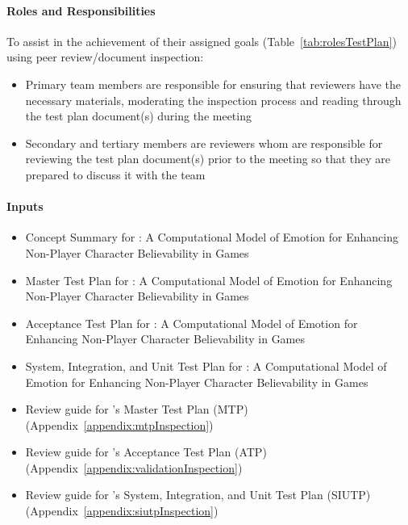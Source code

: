 \paragraph{Roles and Responsibilities} To assist in the achievement of their
assigned goals (Table~\ref{tab:rolesTestPlan}) using peer review/document
inspection:
\begin{itemize}

    \item Primary team members are responsible for ensuring that reviewers have
    the necessary materials, moderating the inspection process and reading
    through the test plan document(s) during the meeting

    \item Secondary and tertiary members are reviewers whom are responsible for
    reviewing the test plan document(s) prior to the meeting so that they are
    prepared to discuss it with the team

\end{itemize}

\paragraph{Inputs}
\begin{itemize}

    \item Concept Summary for \progname{}: A Computational Model of Emotion for
    Enhancing Non-Player Character Believability in Games

    \item Master Test Plan for \progname{}: A Computational Model of Emotion
    for Enhancing Non-Player Character Believability in Games

    \item Acceptance Test Plan for \progname{}: A Computational Model of
    Emotion for Enhancing Non-Player Character Believability in Games

    \item System, Integration, and Unit Test Plan for \progname{}: A
    Computational Model of Emotion for Enhancing Non-Player Character
    Believability in Games

    \item Review guide for \progname{}'s Master Test Plan (MTP)
    (Appendix~\ref{appendix:mtpInspection})

    \item Review guide for \progname{}'s Acceptance Test Plan (ATP)
    (Appendix~\ref{appendix:validationInspection})

    \item Review guide for \progname{}'s System, Integration, and Unit Test
    Plan (SIUTP) (Appendix~\ref{appendix:siutpInspection})

\end{itemize}

